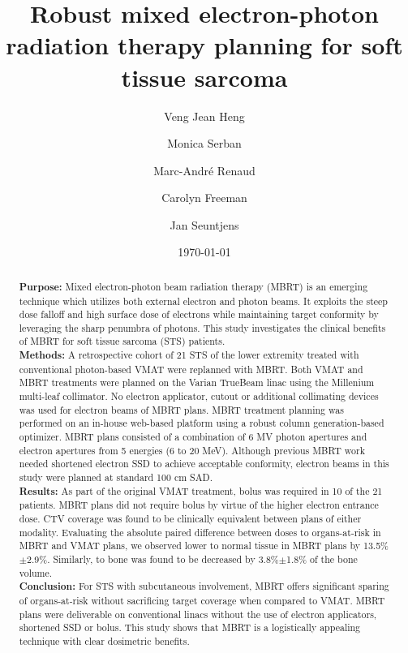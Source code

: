 \documentclass[aapm,graphicx,superscriptaddress]{revtex4-1}
\begin{document}
\linenumbers

\title[Robust MBRT for soft tissue sarcoma]{Robust mixed electron-photon radiation therapy planning for soft tissue sarcoma}

\author{Veng Jean Heng}
\author{Monica Serban}
\author{Marc-Andr\'{e} Renaud}
\author{Carolyn Freeman}
\author{Jan Seuntjens}
\date{\today}

\begin{abstract}
\textbf{Purpose:}
Mixed electron-photon beam radiation therapy (MBRT) is an emerging technique which utilizes both external electron and photon beams. It exploits the steep dose falloff and high surface dose of electrons while maintaining target conformity by leveraging the sharp penumbra of photons. This study investigates the clinical benefits of MBRT for soft tissue sarcoma (STS) patients.\\
\textbf{Methods:}
A retrospective cohort of 21 STS of the lower extremity treated with conventional photon-based VMAT were replanned with MBRT. Both VMAT and MBRT treatments were planned on the Varian TrueBeam linac using the Millenium multi-leaf collimator. No electron applicator, cutout or additional collimating devices was used for electron beams of MBRT plans. MBRT treatment planning was performed on an in-house web-based platform using a robust column generation-based optimizer. MBRT plans consisted of a combination of 6 MV photon apertures and electron apertures from 5 energies (6 to 20 MeV). Although previous MBRT work needed shortened electron SSD to achieve acceptable conformity, electron beams in this study were planned at standard 100 cm SAD.\\
\textbf{Results:}
As part of the original VMAT treatment, bolus was required in 10 of the 21 patients. MBRT plans did not require bolus by virtue of the higher electron entrance dose. CTV coverage was found to be clinically equivalent between plans of either modality. Evaluating the absolute paired difference between doses to organs-at-risk in MBRT and VMAT plans, we observed lower to normal tissue in MBRT plans by 13.5\%$\pm$2.9\%. Similarly, to bone was found to be decreased by 3.8\%$\pm$1.8\% of the bone volume. \\
\textbf{Conclusion:}
For STS with subcutaneous involvement, MBRT offers significant sparing of organs-at-risk without sacrificing target coverage when compared to VMAT. MBRT plans were deliverable on conventional linacs without the use of electron applicators, shortened SSD or bolus. This study shows that MBRT is a logistically appealing technique with clear dosimetric benefits.
\end{abstract}
\end{document}
